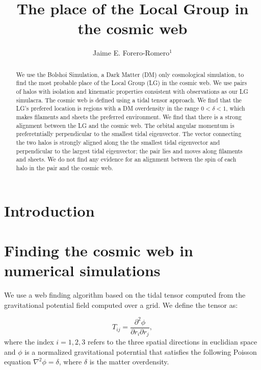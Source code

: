 \documentclass{iau}
\title[The Local Group in the Cosmic Web] %
{The place of the Local Group in the cosmic web}
\author[Jaime E. Forero-Romero]   %
{Jaime E. Forero-Romero$^1$}
\affiliation{$^1$Departamento de F\'isica, Universidad de los Andes, \\ Cra. 1 No. 18A-10, Edificio Ip \\Bogot\'a, Colombia \\ email: {\tt je.forero@uniandes.edu.co} \\[\affilskip]}
\begin{document}
\maketitle

\begin{abstract}
We use the Bolshoi Simulation, a Dark Matter (DM) only cosmological
simulation, to find the most probable place of the
Local Group (LG) in the cosmic web. We use pairs of halos with isolation
and kinematic properties consistent with observations as our LG
simulacra. The cosmic web is defined using a tidal tensor approach. We
find that the LG's prefered location is regions with a DM overdensity
in the range $0<\delta<1$, which makes filaments and sheets the
preferred environment. We find that there is a strong alignment
between the LG and the cosmic web. The orbital angular momentum is
preferetntially perpendicular to the smallest tidal eigenvector. The
vector connecting the two halos is strongly aligned along the
the smallest tidal eigenvector and perpendicular to the
largest tidal eigenvector; the pair lies and moves along
filaments and sheets. We do not find any evidence for an alignment
between the spin of each halo in the pair and the cosmic web. 

\end{abstract}

\firstsection %
\section{Introduction}




\section{Finding the cosmic web in numerical simulations}

We use a web finding algorithm based on the tidal tensor computed from
the gravitational potential field computed over a grid. We define the
tensor as:

\begin{equation}
T_{ij} = \frac{\partial^2\phi}{\partial r_{i}\partial r_{j}}, 
\end{equation}
%
where the index $i=1,2,3$ refers to the three spatial directions in
euclidian space and $\phi$ is a normalized gravitational poterntial
that satisfies the following Poisson equation $\nabla^2 \phi=\delta$,
where $\delta$ is the matter overdensity.
\end{document}
